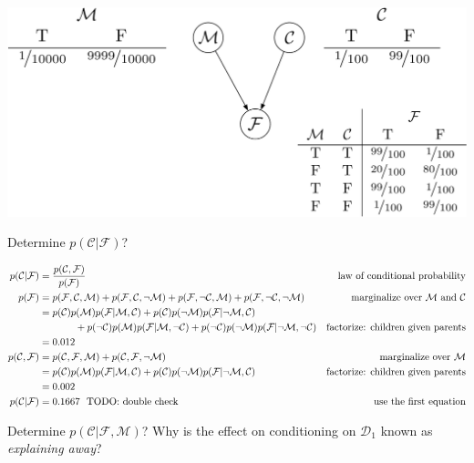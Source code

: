 \documentclass{tufte-handout}
\begin{document}
\begin{exercise}
\begin{center}
\includegraphics[width=0.6\linewidth]{figures/medicaldiagnosis}
\end{center}
\bes
\item Determine $p(\mathcal{C}|\mathcal{F})$?
\begin{boxedsolution}
\begin{align}
p(\mathcal{C}|\mathcal{F}) &= \frac{p(\mathcal{C}, \mathcal{F})}{p(\mathcal{F})} & \mbox{law of conditional probability} \nonumber \\
p(\mathcal{F}) &= p(\mathcal{F}, \mathcal{C}, \mathcal{M}) + p(\mathcal{F}, \mathcal{C}, \neg \mathcal{M}) + p(\mathcal{F}, \neg \mathcal{C}, \mathcal{M}) + p(\mathcal{F}, \neg \mathcal{C}, \neg \mathcal{M}) &\mbox{marginalize over $\mathcal{M}$ and $\mathcal{C}$}\nonumber \\
&= p(\mathcal{C})p(\mathcal{M})p(\mathcal{F}|\mathcal{M},\mathcal{C}) + p(\mathcal{C})p(\neg \mathcal{M})p(\mathcal{F}|\neg \mathcal{M},\mathcal{C}) \nonumber \\
&\hspace{0.5in}+p(\neg \mathcal{C})p(\mathcal{M})p(\mathcal{F}|\mathcal{M},\neg \mathcal{C}) +p(\neg \mathcal{C})p(\neg \mathcal{M})p(\mathcal{F}|\neg \mathcal{M},\neg \mathcal{C}) & \mbox{factorize: children given parents} \nonumber \\
&= 0.012 \nonumber \\
p(\mathcal{C}, \mathcal{F}) &= p(\mathcal{C}, \mathcal{F}, \mathcal{M})  + p(\mathcal{C}, \mathcal{F}, \neg \mathcal{M}) &\mbox{marginalize over $\mathcal{M}$} \nonumber \\
&= p(\mathcal{C})p(\mathcal{M}) p(\mathcal{F}|\mathcal{M}, \mathcal{C}) + p(\mathcal{C})p(\neg \mathcal{M}) p(\mathcal{F}| \neg \mathcal{M}, \mathcal{C})& \mbox{factorize: children given parents} \nonumber \\
&= 0.002 \nonumber \\
p(\mathcal{C}|\mathcal{F}) &=  0.1667~~\mbox{TODO: double check} &\mbox{use the first equation} \nonumber
\end{align}
\end{boxedsolution}
\item Determine $p(\mathcal{C}|\mathcal{F}, \mathcal{M})$?  Why is the effect on conditioning on $\mathcal{D}_1$ known as \emph{explaining away}?

\end{exercise}
\end{document}
